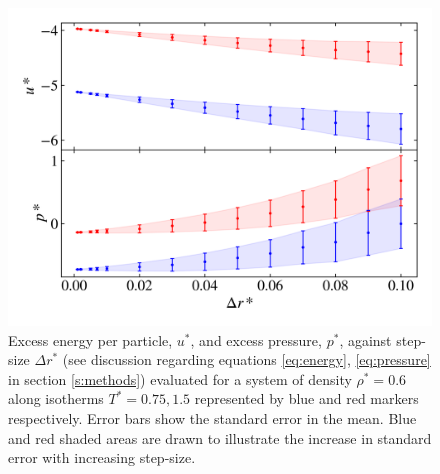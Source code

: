 \documentclass[10pt, twocolumn]{revtex4}    %
\begin{document}
\begin{figure}
	\includegraphics[width=\linewidth]{figures/binWidth/BWFeffect.png}
	\caption{Excess energy per particle, $u^{*}$, and excess pressure, $p^{*}$, against step-size $\Delta{}r^{*}$ (see discussion regarding equations \ref{eq:energy}, \ref{eq:pressure} in section \ref{s:methods}) evaluated for a system of density $\rho{}^{*}=0.6$ along isotherms $T^{*}=0.75, 1.5$ represented by blue and red markers respectively. Error bars show the standard error in the mean. Blue and red shaded areas are drawn to illustrate the increase in standard error with increasing step-size.}
	\label{fig:BWF}
\end{figure}
\end{document}
